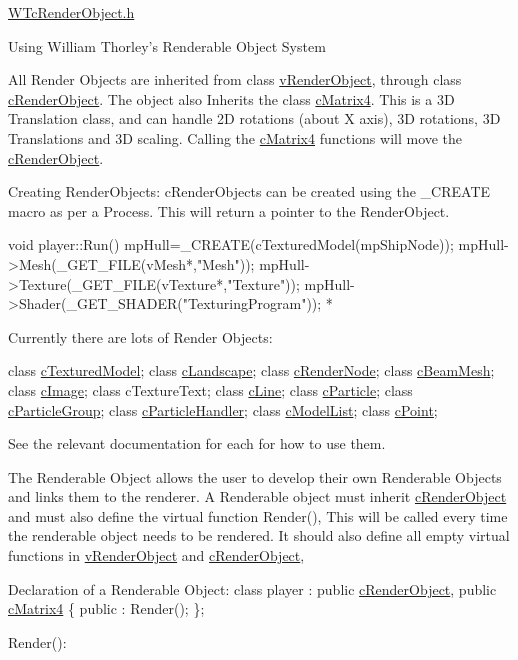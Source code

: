 \hyperlink{_w_tc_render_object_8h_source}{WTcRenderObject.h}

Using William Thorley’s Renderable Object System

All Render Objects are inherited from class \hyperlink{classv_render_object}{vRenderObject}, through class \hyperlink{classc_render_object}{cRenderObject}. The object also Inherits the class \hyperlink{classc_matrix4}{cMatrix4}. This is a 3D Translation class, and can handle 2D rotations (about X axis), 3D rotations, 3D Translations and 3D scaling. Calling the \hyperlink{classc_matrix4}{cMatrix4} functions will move the \hyperlink{classc_render_object}{cRenderObject}.

Creating RenderObjects: cRenderObjects can be created using the \_\-CREATE macro as per a Process. This will return a pointer to the RenderObject. 
\begin{DoxyCode}
 void player::Run()
 {
        mpHull=_CREATE(cTexturedModel(mpShipNode));
        mpHull->Mesh(_GET_FILE(vMesh*,"Mesh"));
        mpHull->Texture(_GET_FILE(vTexture*,"Texture"));
        mpHull->Shader(_GET_SHADER("TexturingProgram"));
 }
 *
\end{DoxyCode}


Currently there are lots of Render Objects:

class \hyperlink{classc_textured_model}{cTexturedModel}; class \hyperlink{classc_landscape}{cLandscape}; class \hyperlink{classc_render_node}{cRenderNode}; class \hyperlink{classc_beam_mesh}{cBeamMesh}; class \hyperlink{classc_image}{cImage}; class cTextureText; class \hyperlink{classc_line}{cLine}; class \hyperlink{classc_particle}{cParticle}; class \hyperlink{classc_particle_group}{cParticleGroup}; class \hyperlink{classc_particle_handler}{cParticleHandler}; class \hyperlink{classc_model_list}{cModelList}; class \hyperlink{classc_point}{cPoint};

See the relevant documentation for each for how to use them.

The Renderable Object allows the user to develop their own Renderable Objects and links them to the renderer. A Renderable object must inherit \hyperlink{classc_render_object}{cRenderObject} and must also define the virtual function Render(), This will be called every time the renderable object needs to be rendered. It should also define all empty virtual functions in \hyperlink{classv_render_object}{vRenderObject} and \hyperlink{classc_render_object}{cRenderObject},

Declaration of a Renderable Object: class player : public \hyperlink{classc_render_object}{cRenderObject}, public \hyperlink{classc_matrix4}{cMatrix4} \{ public : Render(); \};

Render(): 